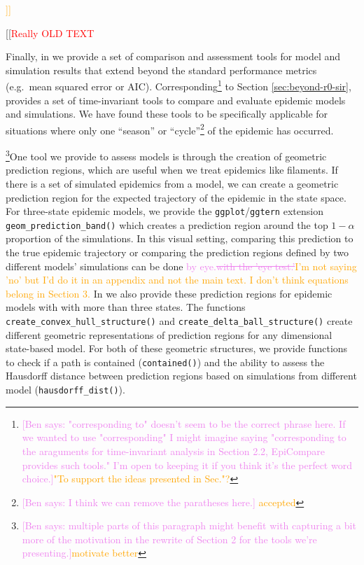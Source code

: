 \documentclass[
  shortnames]{jss}
\begin{document}
\textcolor{orange}{]]}

{[}{[}\textcolor{red}{Really OLD TEXT}

Finally, in  we provide a set of comparison and
assessment tools for model and simulation results that extend beyond the
standard performance metrics (e.g.~mean squared error or AIC).
Corresponding\footnote{\textcolor{violet}{[Ben says: "corresponding to" doesn't seem to be the correct phrase here. If we wanted to use "corresponding" I might imagine saying "corresponding to the araguments for time-invariant analysis in Section 2.2, EpiCompare provides such tools." I'm open to keeping it if you think it's the perfect word choice.]}\textcolor{orange}{"To support the ideas presented in Sec."?}}
to Section \ref{sec:beyond-r0-sir},  provides a set of
time-invariant tools to compare and evaluate epidemic models and
simulations. We have found these tools to be specifically applicable for
situations where only one ``season'' or
``cycle''\footnote{\textcolor{violet}{[Ben says: I think we can remove the paratheses here.]} \textcolor{orange}{accepted}}
of the epidemic has occurred.

\footnote{\textcolor{violet}{[Ben says: multiple parts of this paragraph might benefit with capturing a bit more of the motivation in the rewrite of Section 2 for the tools we're presenting.]}\textcolor{orange}{motivate better}}One
tool we provide to assess models is through the creation of geometric
prediction regions, which are useful when we treat epidemics like
filaments. If there is a set of simulated epidemics from a model, we can
create a geometric prediction region for the expected trajectory of the
epidemic in the state space. For three-state epidemic models, we provide
the \texttt{ggplot}/\texttt{ggtern} extension
\texttt{geom\_prediction\_band()} which creates a prediction region
around the top \(1-\alpha\) proportion of the simulations. In this
visual setting, comparing this prediction to the true epidemic
trajectory or comparing the prediction regions defined by two different
models' simulations can be done
\textcolor{violet}{by eye.\sout{with the 'eye test.'}\textcolor{orange}{I'm not saying 'no' but I'd do it in an appendix and not the main text.  I don't think equations belong in Section 3.}}
In  we also provide these prediction regions for
epidemic models with with more than three states. The functions
\texttt{create\_convex\_hull\_structure()} and
\texttt{create\_delta\_ball\_structure()} create different geometric
representations of prediction regions for any dimensional state-based
model. For both of these geometric structures, we provide functions to
check if a path is contained (\texttt{contained()}) and the ability to
assess the Hausdorff distance between prediction regions based on
simulations from different model (\texttt{hausdorff\_dist()}).
\end{document}
